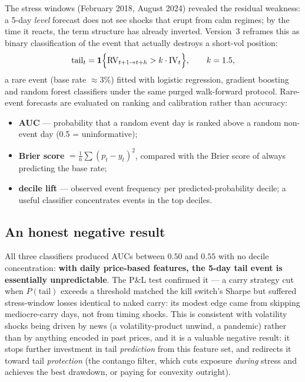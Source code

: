 \documentclass[11pt,a4paper]{article}
\newcommand{\RV}{\mathrm{RV}}
\newcommand{\IV}{\mathrm{IV}}
\begin{document}
The stress windows (February 2018, August 2024) revealed the residual
weakness: a 5-day \emph{level} forecast does not see shocks that erupt from
calm regimes; by the time it reacts, the term structure has already
inverted. Version~3 reframes this as binary classification of the event that
actually destroys a short-vol position:
\begin{equation}
\text{tail}_t = \mathbf{1}\Bigl\{\RV_{t+1\to t+h} > k \cdot \IV_t\Bigr\},
\qquad k = 1.5,
\end{equation}
a rare event (base rate $\approx 3\%$) fitted with logistic regression,
gradient boosting and random forest classifiers under the same purged
walk-forward protocol. Rare-event forecasts are evaluated on ranking and
calibration rather than accuracy:
\begin{itemize}
\item \textbf{AUC} --- probability that a random event day is ranked above a
  random non-event day (0.5 = uninformative);
\item \textbf{Brier score} $= \frac{1}{n}\sum (p_t - y_t)^2$, compared with
  the Brier score of always predicting the base rate;
\item \textbf{decile lift} --- observed event frequency per predicted-probability
  decile; a useful classifier concentrates events in the top deciles.
\end{itemize}

\subsection{An honest negative result}

All three classifiers produced AUCs between $0.50$ and $0.55$ with no decile
concentration: \textbf{with daily price-based features, the 5-day tail event
is essentially unpredictable}. The P\&L test confirmed it --- a carry
strategy cut when $P(\text{tail})$ exceeds a threshold matched the kill
switch's Sharpe but suffered stress-window losses identical to naked carry:
its modest edge came from skipping mediocre-carry days, not from timing
shocks. This is consistent with volatility shocks being driven by news
(a volatility-product unwind, a pandemic) rather than by anything encoded in
past prices, and it is a valuable negative result: it stops further
investment in tail \emph{prediction} from this feature set, and redirects it
toward tail \emph{protection} (the contango filter, which cuts exposure
\emph{during} stress and achieves the best drawdown, or paying for convexity
outright).
\end{document}

